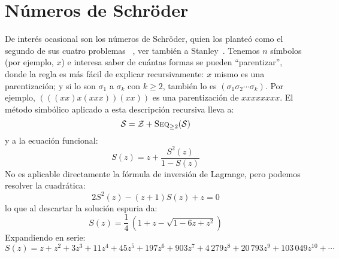 \section{Números de Schröder}
\label{sec:numeros-Schroeder}

  De interés ocasional son los números de Schröder,
  quien los planteó como el segundo de sus cuatro problemas~%
    \cite{schroeder70:_vier_probleme},
  ver también a Stanley~\cite{stanley97:_hippar_plutar_schroed_hough}.
  Tenemos \(n\) símbolos
  (por ejemplo, \(x\))
  e interesa saber de cuántas formas se pueden ``parentizar'',
  donde la regla es más fácil de explicar recursivamente:
  \(x\) mismo es una parentización;
  y si lo son \(\sigma_1\) a \(\sigma_k\) con \(k \ge 2\),
  también lo es \((\sigma_1 \sigma_2 \dotsm \sigma_k)\).
  Por ejemplo,
  \((((x x) x (x x x)) (x x))\)
  es una parentización de \(x x x x x x x x\).
  El método simbólico aplicado a esta descripción recursiva
  lleva a:%
  \begin{equation}
    \label{eq:Schroeder-symbolic}
    \mathcal{S}
      = \mathcal{Z} + \operatorname{\textsc{Seq}}_{\ge 2}(\mathcal{S})
  \end{equation}
  y a la ecuación funcional:
  \begin{equation*}
    S(z)
      = z + \frac{S^2(z)}{1 - S(z)}
  \end{equation*}
  No es aplicable directamente la fórmula de inversión de Lagrange,%
  pero podemos resolver la cuadrática:
  \begin{equation}
    \label{eq:Schroeder-functional}
    2 S^2(z) - (z + 1) S(z) + z
      = 0
  \end{equation}
  lo que al descartar la solución espuria da:
  \begin{equation}
    \label{eq:Schroeder-gf}
    S(z)
      = \frac{1}{4} \, \left( 1 + z - \sqrt{1 - 6 z + z^2} \right)
  \end{equation}
  Expandiendo en serie:
  \begin{equation*}
    S(z)
      = z + z^2 + 3 z^3 + 11 z^4 + 45 z^5 + 197 z^6 + 903 z^7
	  + 4\,279 z^8 + 20\,793 z^9 + 103\,049 z^{10} + \dotsb
  \end{equation*}

